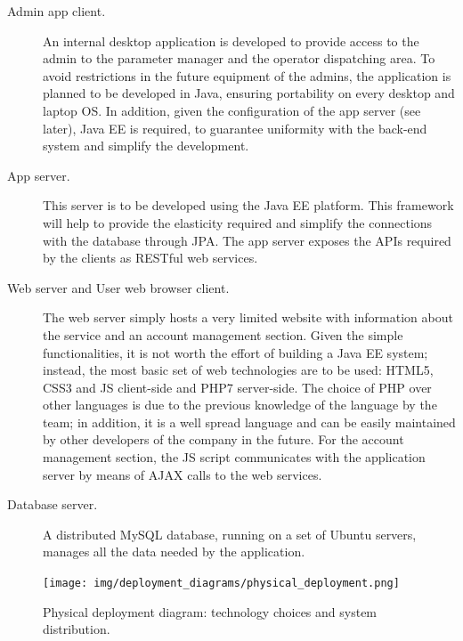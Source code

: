 \begin{description}
		\item[Admin app client.] An internal desktop application is developed to provide access to the admin to the parameter manager and the operator dispatching area. To avoid restrictions in the future equipment of the admins, the application is planned to be developed in Java, ensuring portability on every desktop and laptop OS. In addition, given the configuration of the app server (see later), Java EE is required, to guarantee uniformity with the back-end system and simplify the development.

		\item[App server.] This server is to be developed using the Java EE platform. This framework will help to provide the elasticity required and simplify the connections with the database through JPA. The app server exposes the APIs required by the clients as RESTful web services.

		\item[Web server and User web browser client.] The web server simply hosts a very limited website with information about the service and an account management section. Given the simple functionalities, it is not worth the effort of building a Java EE system; instead, the most basic set of web technologies are to be used: HTML5, CSS3 and JS client-side and PHP7 server-side. The choice of PHP over other languages is due to the previous knowledge of the language by the team; in addition, it is a well spread language and can be easily maintained by other developers of the company in the future. For the account management section, the JS script communicates with the application server by means of AJAX calls to the web services.

		\item[Database server.] A distributed MySQL database, running on a set of Ubuntu servers, manages all the data needed by the application.
	\end{description}

\begin{figure}
	\texttt{[image: img/deployment\_diagrams/physical\_deployment.png]}
	\caption{Physical deployment diagram: technology choices and system distribution.}
\end{figure}

\FloatBarrier
